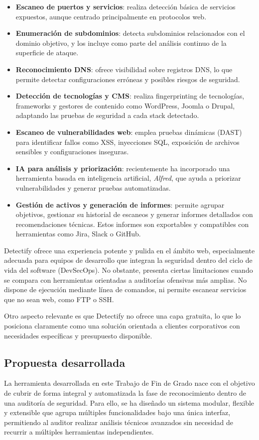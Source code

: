 \begin{parskipenv}
\begin{itemize}
  \item \textbf{Escaneo de puertos y servicios}: realiza detección básica de servicios expuestos, aunque centrado principalmente en protocolos web.
  \item \textbf{Enumeración de subdominios}: detecta subdominios relacionados con el dominio objetivo, y los incluye como parte del análisis continuo de la superficie de ataque.
  \item \textbf{Reconocimiento DNS}: ofrece visibilidad sobre registros DNS, lo que permite detectar configuraciones erróneas y posibles riesgos de seguridad.
  \item \textbf{Detección de tecnologías y CMS}: realiza fingerprinting de tecnologías, frameworks y gestores de contenido como WordPress, Joomla o Drupal, adaptando las pruebas de seguridad a cada stack detectado.
  \item \textbf{Escaneo de vulnerabilidades web}: emplea pruebas dinámicas (DAST) para identificar fallos como XSS, inyecciones SQL, exposición de archivos sensibles y configuraciones inseguras.
  \item \textbf{IA para análisis y priorización}: recientemente ha incorporado una herramienta basada en inteligencia artificial, \textit{Alfred}, que ayuda a priorizar vulnerabilidades y generar pruebas automatizadas.
  \item \textbf{Gestión de activos y generación de informes}: permite agrupar objetivos, gestionar su historial de escaneos y generar informes detallados con recomendaciones técnicas. Estos informes son exportables y compatibles con herramientas como Jira, Slack o GitHub.
\end{itemize}

Detectify ofrece una experiencia potente y pulida en el ámbito web, especialmente adecuada para equipos de desarrollo que integran la seguridad dentro del ciclo de vida del software (DevSecOps). No obstante, presenta ciertas limitaciones cuando se compara con herramientas orientadas a auditorías ofensivas más amplias. No dispone de ejecución mediante línea de comandos, ni permite escanear servicios que no sean web, como FTP o SSH.

Otro aspecto relevante es que Detectify no ofrece una capa gratuita, lo que lo posiciona claramente como una solución orientada a clientes corporativos con necesidades específicas y presupuesto disponible.

\subsection{Propuesta desarrollada}
La herramienta desarrollada en este Trabajo de Fin de Grado nace con el objetivo de cubrir de forma integral y automatizada la fase de reconocimiento dentro de una auditoría de seguridad. Para ello, se ha diseñado un sistema modular, flexible y extensible que agrupa múltiples funcionalidades bajo una única interfaz, permitiendo al auditor realizar análisis técnicos avanzados sin necesidad de recurrir a múltiples herramientas independientes.


\end{parskipenv}
